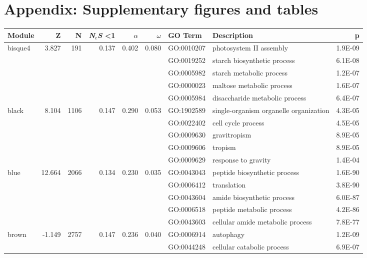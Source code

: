 \section{Appendix: Supplementary figures and tables}

\begin{landscape}

\begin{table}[ht]
\centering
\begin{tabular}{lrrrrrlP{5cm}r}
  \hline
Module & Z & N & \textit{N$_{e}$S} \textless 1 & $\alpha$ & $\omega$ & GO Term & Description & p \\ 
  \hline
bisque4 & 3.827 & 191 & 0.137 & 0.402 & 0.080 & GO:0010207 & photosystem II assembly & 1.9E-09 \\ 
   &  &  &  &  &  & GO:0019252 & starch biosynthetic process & 6.1E-08 \\ 
   &  &  &  &  &  & GO:0005982 & starch metabolic process & 1.2E-07 \\ 
   &  &  &  &  &  & GO:0000023 & maltose metabolic process & 1.6E-07 \\ 
   &  &  &  &  &  & GO:0005984 & disaccharide metabolic process & 6.4E-07 \\ 
\hline
  black & 8.104 & 1106 & 0.147 & 0.290 & 0.053 & GO:1902589 & single-organism organelle organization & 4.3E-05 \\ 
   &  &  &  &  &  & GO:0022402 & cell cycle process & 4.5E-05 \\ 
   &  &  &  &  &  & GO:0009630 & gravitropism & 8.9E-05 \\ 
   &  &  &  &  &  & GO:0009606 & tropism & 8.9E-05 \\ 
   &  &  &  &  &  & GO:0009629 & response to gravity & 1.4E-04 \\ 
\hline  
blue & 12.664 & 2066 & 0.134 & 0.230 & 0.035 & GO:0043043 & peptide biosynthetic process & 1.6E-90 \\ 
   &  &  &  &  &  & GO:0006412 & translation & 3.8E-90 \\ 
   &  &  &  &  &  & GO:0043604 & amide biosynthetic process & 6.0E-87 \\ 
   &  &  &  &  &  & GO:0006518 & peptide metabolic process & 4.2E-86 \\ 
   &  &  &  &  &  & GO:0043603 & cellular amide metabolic process & 7.8E-77 \\ 
\hline  
brown & -1.149 & 2757 & 0.147 & 0.236 & 0.040 & GO:0006914 & autophagy & 1.2E-09 \\ 
   &  &  &  &  &  & GO:0044248 & cellular catabolic process & 6.9E-07 \\ 

\end{tabular}
\end{table}
\end{landscape}
